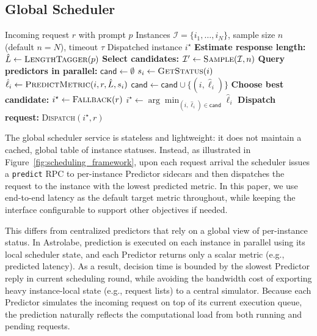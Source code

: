 \documentclass[sigconf, review, anonymous]{acmart}
\begin{document}
\subsection{Global Scheduler} \label{section:schedulers}

\begin{algorithm}[t]
\caption{Astrolabe one-shot dispatch (default: latency)}
\label{alg:astrolabe_dispatch}
\begin{algorithmic}[1]
\Require Incoming request $r$ with prompt $p$
\Require Instances $\mathcal{I}=\{i_1,\dots,i_N\}$, sample size $n$ (default $n{=}N$), timeout $\tau$
\Ensure Dispatched instance $i^\star$
\State \textbf{Estimate response length:} $\hat{L} \gets \textsc{LengthTagger}(p)$
\State \textbf{Select candidates:} $\mathcal{I}' \gets \textsc{Sample}(\mathcal{I}, n)$ 
\State \textbf{Query predictors in parallel:} $\mathsf{cand} \gets \emptyset$
    \State $s_i \gets \textsc{GetStatus}(i)$
    \State $\hat{\ell}_i \gets \textsc{PredictMetric}(i, r, \hat{L}, s_i)$ 
        \State $\mathsf{cand} \gets \mathsf{cand} \cup \{(i,\hat{\ell}_i)\}$
    \EndIf
\EndFor
\State \textbf{Choose best candidate:}
    \State $i^\star \gets \textsc{Fallback}(r)$
\Else
    \State $i^\star \gets \arg\min_{(i,\hat{\ell}_i)\in \mathsf{cand}} \hat{\ell}_i$
\EndIf
\State \textbf{Dispatch request:} \textsc{Dispatch}$(i^\star, r)$
\end{algorithmic}
\end{algorithm}


The global scheduler service is stateless and lightweight: it does not maintain a cached, global table of instance statuses. Instead, as illustrated in Figure~\ref{fig:scheduling_framework}, upon each request arrival the scheduler issues a \texttt{predict} RPC to per-instance Predictor sidecars and then dispatches the request to the instance with the lowest predicted metric. In this paper, we use end-to-end latency as the default target metric throughout, while keeping the interface configurable to support other objectives if needed.

This differs from centralized predictors that rely on a global view of per-instance status. In Astrolabe, prediction is executed on each instance in parallel using its local scheduler state, and each Predictor returns only a scalar metric (e.g., predicted latency). As a result, decision time is bounded by the slowest Predictor reply in current scheduling round, while avoiding the bandwidth cost of exporting heavy instance-local state (e.g., request lists) to a central simulator. Because each Predictor simulates the incoming request on top of its current execution queue, the prediction naturally reflects the computational load from both running and pending requests.
\end{document}
